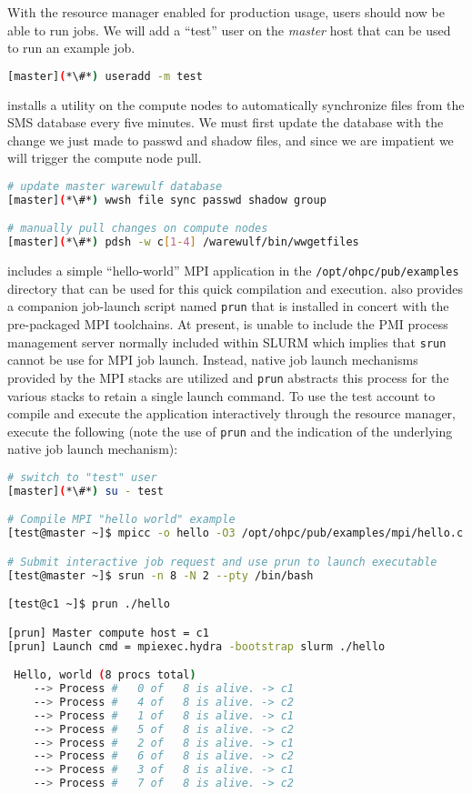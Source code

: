 With the resource manager enabled for production usage, users should now be
able to run jobs.  We will add a ``test'' user on the {\em master}
host that can be used to run an example job.

\begin{lstlisting}[language=bash,keywords={}]
[master](*\#*) useradd -m test
\end{lstlisting}

\Warewulf{} installs a utility on the compute nodes to automatically 
synchronize files from the SMS database every five minutes. 
We must first update the database with the change we just made to passwd and 
shadow files, and since we are impatient we will trigger the compute node pull.

\begin{lstlisting}[language=bash,keywords={}]
# update master warewulf database
[master](*\#*) wwsh file sync passwd shadow group

# manually pull changes on compute nodes
[master](*\#*) pdsh -w c[1-4] /warewulf/bin/wwgetfiles 
\end{lstlisting}

\OHPC{} includes a simple ``hello-world'' MPI application in the
\texttt{/opt/ohpc/pub/examples} directory that can be used for this quick
compilation and execution. \OHPC{} also provides a companion job-launch
script named \texttt{prun} that is installed in concert with the pre-packaged
MPI toolchains. At present, \OHPC{} is unable to include the PMI process management
server normally included within SLURM which implies that \texttt{srun} cannot be
use for MPI job launch. Instead, native job launch mechanisms provided by the
MPI stacks are utilized and \texttt{prun} abstracts this process for the various
stacks to retain a single launch command. To use the test account to compile and execute the
application interactively through the resource manager, execute the following
(note the use of \texttt{prun} and the indication of the underlying native job
launch mechanism):

\begin{lstlisting}[language=bash,keywords={}]
# switch to "test" user
[master](*\#*) su - test

# Compile MPI "hello world" example
[test@master ~]$ mpicc -o hello -O3 /opt/ohpc/pub/examples/mpi/hello.c

# Submit interactive job request and use prun to launch executable
[test@master ~]$ srun -n 8 -N 2 --pty /bin/bash

[test@c1 ~]$ prun ./hello

[prun] Master compute host = c1
[prun] Launch cmd = mpiexec.hydra -bootstrap slurm ./hello

 Hello, world (8 procs total)
    --> Process #   0 of   8 is alive. -> c1
    --> Process #   4 of   8 is alive. -> c2
    --> Process #   1 of   8 is alive. -> c1
    --> Process #   5 of   8 is alive. -> c2
    --> Process #   2 of   8 is alive. -> c1
    --> Process #   6 of   8 is alive. -> c2
    --> Process #   3 of   8 is alive. -> c1
    --> Process #   7 of   8 is alive. -> c2
\end{lstlisting}

